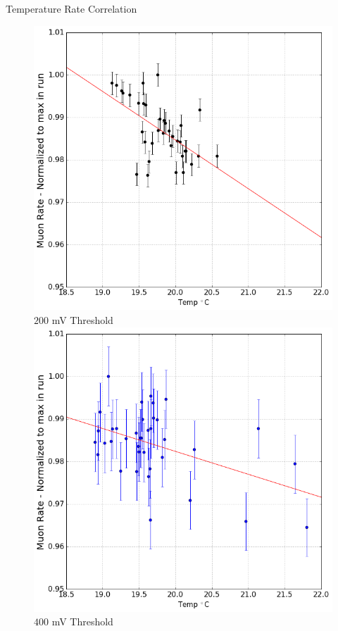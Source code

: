 \documentclass{beamer}
\begin{document}
\begin{frame}{Temperature Rate Correlation}
\centering

\begin{figure}
\begin{multicols}{2}
\centering
\includegraphics[scale=.23]{../Figures/lowCorrelation.png}\\
$200$ mV Threshold
\includegraphics[scale=.23]{../Figures/highCorrelation.png}\\
$400$ mV Threshold
\end{multicols}
{\caption*{}}
\end{figure}



\end{frame}
\end{document}
